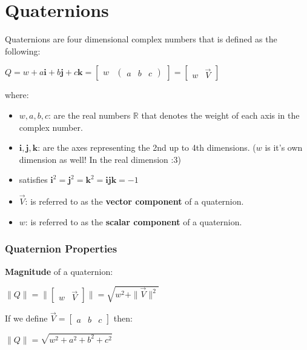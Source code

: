 \chapter{Quaternions}
Quaternions are four dimensional complex numbers that is defined as the following:

\begin{center}
    $Q = w + a\mathbf{i} + b\mathbf{j} + c\mathbf{k}=\begin{bmatrix}w & \begin{pmatrix}a & b & c\end{pmatrix}\end{bmatrix}=\begin{bmatrix}w & \vec{V}\end{bmatrix}$
\end{center}

where:
\begin{itemize}
    \item $w, a, b, c$: are the real numbers $\mathbb{R}$ that denotes the weight of each axis in the complex number.
    \item $\mathbf{i}, \mathbf{j}, \mathbf{k}$: are the axes representing the 2nd up to 4th dimensions. ($w$ is it's own dimension as well! In the real dimension :3)
    \item satisfies $\mathbf{i}^2=\mathbf{j}^2=\mathbf{k}^2=\mathbf{ijk}=-1$
    \item $\vec{V}$: is referred to as the \textbf{vector component} of a quaternion.
    \item $w$: is referred to as the \textbf{scalar component} of a quaternion.
\end{itemize}



\subsection{Quaternion Properties}

\textbf{Magnitude} of a quaternion:
\begin{center}
    $\|Q\| = \|\begin{bmatrix}w & \vec{V}\end{bmatrix}\| = \sqrt{w^2 + \|\vec{V}\|^2}$
\end{center}

If we define $\vec{V} = \begin{bmatrix}a & b & c\end{bmatrix}$ then:
\begin{center}
    $\|Q\| = \sqrt{w^2 + a^2 + b^2 + c^2}$
\end{center}

